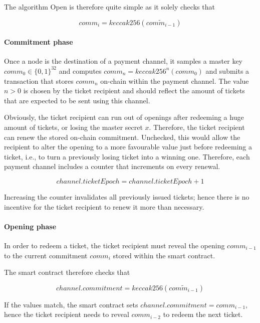 The algorithm \textsf{Open} is therefore quite simple as it solely checks that

$$ comm_i = keccak256 (\widetilde{comm_{i-1}}) $$

\paragraph{Commitment phase}
\label{sec:incentives:commitment:commitmentphase}

Once a node is the destination of a payment channel, it samples a master key $comm_0 \in \{0, 1\}^{32}$ and computes $comm_n = keccak256^n(comm_0)$ and submits a transaction that stores $comm_n$ on-chain within the payment channel. The value $n > 0$ is chosen by the ticket recipient and should reflect the amount of tickets that are expected to be sent using this channel.

Obviously, the ticket recipient can run out of openings after redeeming a huge amount of tickets, or losing the master secret $x$. Therefore, the ticket recipient can renew the stored on-chain commitment. Unchecked, this would allow the recipient to alter the opening to a more favourable value just before redeeming a ticket, i.e., to turn a previously losing ticket into a winning one. Therefore, each payment channel includes a counter that increments on every renewal.

$$ channel.ticketEpoch = channel.ticketEpoch + 1 $$

Increasing the counter invalidates all previously issued tickets; hence there is no incentive for the ticket recipient to renew it more than necessary.

\paragraph{Opening phase}

In order to redeem a ticket, the ticket recipient must reveal the opening $comm_{i-1}$ to the current commitment $comm_i$ stored within the smart contract.

The smart contract therefore checks that

$$ channel.commitment = keccak256 (\widetilde{comm_{i-1}}) $$

If the values match, the smart contract sets $channel.commitment = comm_{i-1}$, hence the ticket recipient needs to reveal $comm_{i-2}$ to redeem the next ticket.
